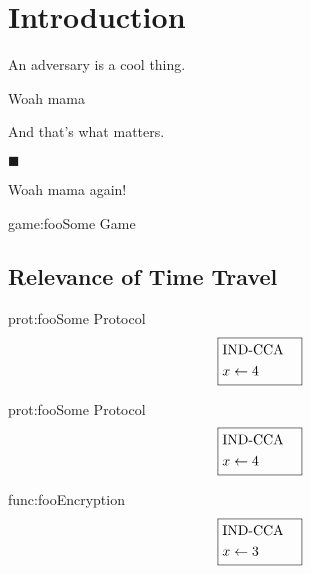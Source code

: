 \section{Introduction}
\begin{definition}[Adversaries]
An adversary is a cool thing.
\end{definition}

\begin{theorem}
    Woah mama

And that's what matters.

$\blacksquare$
\end{theorem}

\begin{lemma}
    Woah mama again!
\end{lemma}

\begin{game}{game:foo}{Some Game}
\end{game}

\subsection{Relevance of Time Travel}

\begin{protocol}{prot:foo}{Some Protocol}
$$
\boxed{
\begin{aligned}
&\text{IND-CCA}\cr
&x \gets 4\cr
\end{aligned}
}
$$
\end{protocol}

\begin{protocol}{prot:foo}{Some Protocol}
$$
\boxed{
\begin{aligned}
&\text{IND-CCA}\cr
&x \gets 4\cr
\end{aligned}
}
$$
\end{protocol}

\begin{functionality}{func:foo}{Encryption}
$$
\boxed{
\begin{aligned}
&\text{IND-CCA}\cr
&x \gets 3\cr
\end{aligned}
}
$$
\end{functionality}

